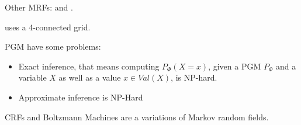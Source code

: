 Other \glspl{MRF}: \cite{zhang2001segmentation} and \cite{moser2012markov}.

\cite{shotton2006textonboost} uses a 4-connected grid.

\Gls{PGM} have some problems:

\begin{itemize}
    \item Exact inference, that means computing \(P_\Phi(X=x)\), given a
          \Gls{PGM} $P_\Phi$ and a variable \(X\) as well as a value \(x \in Val(X)\),
          is NP-hard.
    \item Approximate inference is NP-Hard
\end{itemize}














\Glspl{CRF} and Boltzmann Machines are a variations of Markov random fields.

%

